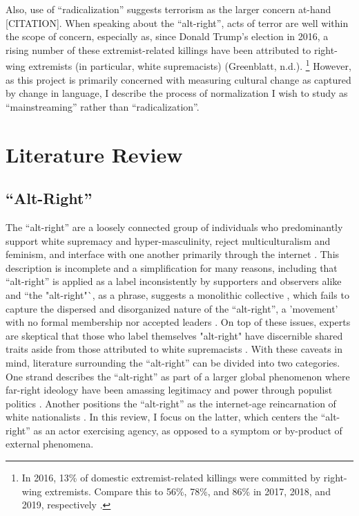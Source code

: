 \documentclass[acmlarge, screen, authorversion]{acmart}
\begin{document}
Also, use of “radicalization” suggests terrorism as the larger
concern at-hand [CITATION]. When speaking about the “alt-right”, acts of
terror are well within the scope of concern, especially as, since Donald
Trump’s election in 2016, a rising number of these extremist-related
killings have been attributed to right-wing extremists (in particular,
white supremacists) (Greenblatt, n.d.). \footnote{In 2016, 13\% of domestic extremist-related
	killings were committed by right-wing extremists. Compare this to 56\%,
	78\%, and 86\% in 2017, 2018, and 2019, respectively \cite{greenblattRightWingExtremistViolence}.
} However, as this project is primarily concerned with
measuring cultural change as captured by change in language, I describe
the process of normalization I wish to study as “mainstreaming” rather
than “radicalization”.


\section{Literature Review}

\subsection{``Alt-Right''}

The ``alt-right” are a loosely connected group of individuals who predominantly support white supremacy and hyper-masculinity, reject multiculturalism and feminism, and interface with one another primarily through the internet
\cite{sternProudBoysWhite2019, mainRiseAltRight2018, nagleKillAllNormies2017, hawleyMakingSenseAltright2017}.
This description is incomplete and a simplification for
many reasons, including that ``alt-right'' is applied as a label inconsistently
by supporters and observers alike \cite{hawleyMakingSenseAltright2017} and
``the "alt-right"`, as a phrase, suggests a monolithic collective
\cite{massanariRethinkingResearchEthics2018}, which fails to capture the
dispersed and disorganized \cite{martinDissectingTrumpMost2017} nature of the
``alt-right'', a 'movement' with no formal membership nor accepted leaders
\cite{hawleyMakingSenseAltright2017}. On top of these issues, experts are
skeptical that those who label themselves "alt-right" have discernible shared
traits aside from those attributed to white supremacists
\cite{gallaherMainstreamingWhiteSupremacy2020,
johndaniszewskiWritingAltright2016}.  With these caveats in mind, literature
surrounding the ``alt-right” can be divided into two categories. One strand
describes the ``alt-right'' as part
of a larger global phenomenon where far-right ideology have been
amassing legitimacy and power through populist politics
\cite{cammaertsMainstreamingExtremeRightWing2018,
worthMorbidSymptomsGlobal2019}. Another positions the
``alt-right” as the internet-age reincarnation of white nationalists
\cite{hawleyMakingSenseAltright2017, mainRiseAltRight2018}. In this review,
I focus on the latter, which centers the ``alt-right'' as an actor exercising agency, as opposed to a symptom or by-product of external phenomena.
\end{document}
